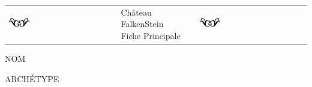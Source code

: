 \documentclass[a5paper,french]{article}
\begin{document}




\clearpage


\begin{center}
	\begin{tabular}[c]{ p{} p{} p{} }
		\includegraphics[width=0.20\textwidth]{../../images/artsdecos/ornement08whiteBG.png} & 
			\centering
			{ \Huge{\setmainfont{Chomsky} Château FalkenStein } }~\newline~\newline~\newline
			{ \LARGE{ \setmainfont{Z003} Fiche Principale } }
		& \includegraphics[width=0.20\textwidth]{../../images/artsdecos/ornement08whiteBG.png} \\
	\end{tabular}
\end{center}

\begin{minipage}[ht]{0.48\textwidth}
	NOM~\newline~\newline
\end{minipage} \hfill \begin{minipage}[ht]{0.48\textwidth}
	ARCHÉTYPE~\newline~\newline
\end{minipage}~\\~\\
\end{document}
